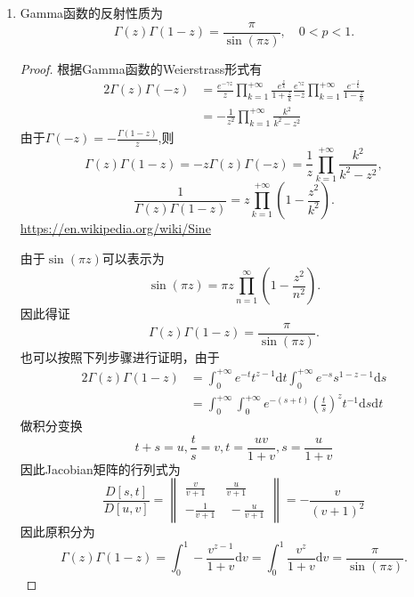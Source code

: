 \begin{property}
\begin{enumerate}[noitemsep]
		\item Gamma函数的反射性质为
		\begin{equation}
		\Gamma\left(z\right)\Gamma\left(1-z\right) = \frac{\pi}{\sin\left(\pi z\right)},\quad 0<p<1.
		\end{equation}
		
		\begin{proof}
			根据Gamma函数的Weierstrass形式有
			\begin{alignat*}{2}
			\Gamma\left(z\right)\Gamma\left(-z\right) & = \frac{e^{-\gamma z}}{z} \prod_{k=1}^{+\infty}\frac{e^{\frac{z}{k}}}{1+\frac{z}{k}}\frac{e^{\gamma z}}{-z} \prod_{k=1}^{+\infty}\frac{e^{-\frac{z}{k}}}{1-\frac{z}{k}} \\ 
			& = -\frac{1}{z^2}\prod_{k=1}^{+\infty}\frac{k^2}{k^2-z^2}
			\end{alignat*}
			由于$\displaystyle \Gamma(-z)= -\frac{\Gamma(1-z)}{z}$,则
			$$\Gamma\left(z\right)\Gamma\left(1-z\right) = - z \Gamma\left(z\right)\Gamma\left(-z\right) = \frac{1}{z}\prod_{k=1}^{+\infty}\frac{k^2}{k^2-z^2},$$
			$$\frac{1}{\Gamma\left(z\right)\Gamma\left(1-z\right)} = z\prod_{k=1}^{+\infty}\left(1-\frac{z^2}{k^2}\right).$$
			 \url{https://en.wikipedia.org/wiki/Sine}
			
			由于$\sin(\pi z)$可以表示为
			$$\sin(\pi z)=\pi z\prod _{n=1}^{\infty }\left(1-{\frac {z^{2}}{n^{2}}}\right).$$
			因此得证
			$$\Gamma\left(z\right)\Gamma\left(1-z\right) = \frac{\pi}{\sin\left(\pi z\right)}.$$
			也可以按照下列步骤进行证明，由于
			\begin{alignat*}{2}
			\Gamma\left(z\right) \Gamma\left(1-z\right) & = \int_0^{+\infty} e^{-t} t^{z-1} \mathrm{d}t \int_0^{+\infty} e^{-s} s^{1-z-1} \mathrm{d}s \\
			& = \int_0^{+\infty} \int_0^{+\infty} e^{-\left(s+t\right)} \left(\frac{t}{s}\right)^z t^{-1} \mathrm{d}s \mathrm{d}t               
			\end{alignat*}
			做积分变换$$t+s=u,\frac{t}{s}=v,t = \frac{uv}{1+v},s = \frac{u}{1+v}$$
			因此Jacobian矩阵的行列式为
			$$
			\frac{D\left[s,t\right]}{D\left[u,v\right]} = \begin{Vmatrix}
			\frac{v}{v+1}& \frac{u}{v+1} \\ -\frac{1}{v+1}& \ - \frac{u}{v+1}
			\end{Vmatrix} = -\frac{v}{\left(v+1\right)^2}
			$$
			因此原积分为
			$$\Gamma\left(z\right) \Gamma\left(1-z\right) = \int_0^{1} -\frac{v^{z-1}}{1+v} \mathrm{d}v =  \int_0^{1} \frac{v^{z}}{1+v} \mathrm{d}v =  \frac{\pi}{\sin\left(\pi z\right)}. $$
		\end{proof}
		
	\end{enumerate}
\end{property}



